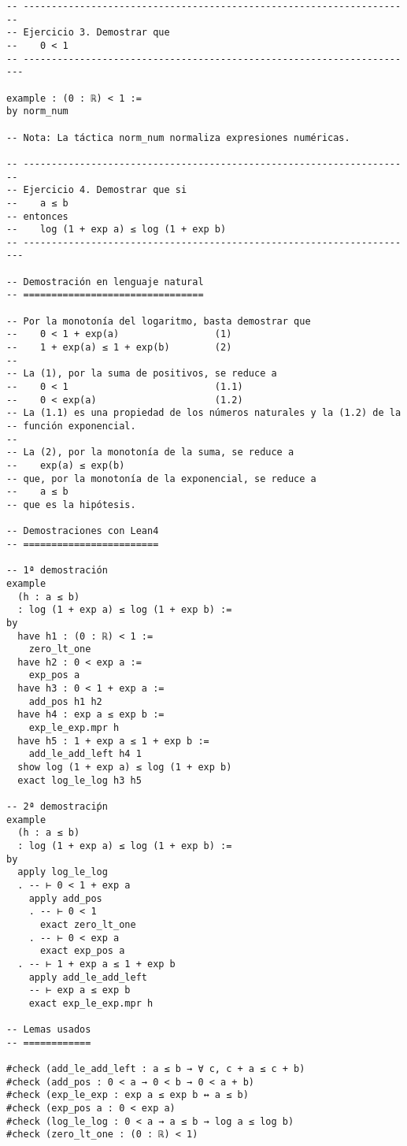 \begin{verbatim}
-- ---------------------------------------------------------------------
-- Ejercicio 3. Demostrar que
--    0 < 1
-- ----------------------------------------------------------------------

example : (0 : ℝ) < 1 :=
by norm_num

-- Nota: La táctica norm_num normaliza expresiones numéricas.

-- ---------------------------------------------------------------------
-- Ejercicio 4. Demostrar que si
--    a ≤ b
-- entonces
--    log (1 + exp a) ≤ log (1 + exp b)
-- ----------------------------------------------------------------------

-- Demostración en lenguaje natural
-- ================================

-- Por la monotonía del logaritmo, basta demostrar que
--    0 < 1 + exp(a)                 (1)
--    1 + exp(a) ≤ 1 + exp(b)        (2)
--
-- La (1), por la suma de positivos, se reduce a
--    0 < 1                          (1.1)
--    0 < exp(a)                     (1.2)
-- La (1.1) es una propiedad de los números naturales y la (1.2) de la
-- función exponencial.
--
-- La (2), por la monotonía de la suma, se reduce a
--    exp(a) ≤ exp(b)
-- que, por la monotonía de la exponencial, se reduce a
--    a ≤ b
-- que es la hipótesis.

-- Demostraciones con Lean4
-- ========================

-- 1ª demostración
example
  (h : a ≤ b)
  : log (1 + exp a) ≤ log (1 + exp b) :=
by
  have h1 : (0 : ℝ) < 1 :=
    zero_lt_one
  have h2 : 0 < exp a :=
    exp_pos a
  have h3 : 0 < 1 + exp a :=
    add_pos h1 h2
  have h4 : exp a ≤ exp b :=
    exp_le_exp.mpr h
  have h5 : 1 + exp a ≤ 1 + exp b :=
    add_le_add_left h4 1
  show log (1 + exp a) ≤ log (1 + exp b)
  exact log_le_log h3 h5

-- 2ª demostraciṕn
example
  (h : a ≤ b)
  : log (1 + exp a) ≤ log (1 + exp b) :=
by
  apply log_le_log
  . -- ⊢ 0 < 1 + exp a
    apply add_pos
    . -- ⊢ 0 < 1
      exact zero_lt_one
    . -- ⊢ 0 < exp a
      exact exp_pos a
  . -- ⊢ 1 + exp a ≤ 1 + exp b
    apply add_le_add_left
    -- ⊢ exp a ≤ exp b
    exact exp_le_exp.mpr h

-- Lemas usados
-- ============

#check (add_le_add_left : a ≤ b → ∀ c, c + a ≤ c + b)
#check (add_pos : 0 < a → 0 < b → 0 < a + b)
#check (exp_le_exp : exp a ≤ exp b ↔ a ≤ b)
#check (exp_pos a : 0 < exp a)
#check (log_le_log : 0 < a → a ≤ b → log a ≤ log b)
#check (zero_lt_one : (0 : ℝ) < 1)
\end{verbatim}

